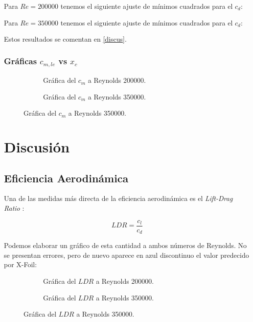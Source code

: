 \documentclass{article}
\begin{document}
Para $Re = 200000$ tenemos el siguiente ajuste de mínimos cuadrados para el $c_d$:



Para $Re = 350000$ tenemos el siguiente ajuste de mínimos cuadrados para el $c_d$:



Estos resultados se comentan en \ref{discus}.

\subsubsection{Gráficas \texorpdfstring{$c_{m,le}$}{momentos} vs \texorpdfstring{$x_c$}{posición}}

\begin{figure}[H]
    \centering
    \begin{subfigure}{.48\textwidth}
        \resizebox{\linewidth}{!}{}
        \caption{Gráfica del $c_{m}$ a Reynolds 200000. }
        \label{fig:res13}    
    \end{subfigure}
    \hspace{0cm}
    \begin{subfigure}{.48\textwidth}
        \resizebox{\linewidth}{!}{}
        \caption{Gráfica del $c_{m}$ a Reynolds 350000. }
        \label{fig:res14}     
    \end{subfigure}
\end{figure}
\section{Discusión}

\subsection{Eficiencia Aerodinámica}

Una de las medidas más directa de la eficiencia aerodinámica es el \textit{Lift-Drag Ratio} \cite{Anderson}:

$$LDR = \frac{c_l}{c_d}$$

Podemos elaborar un gráfico de esta cantidad a ambos números de Reynolds. No se presentan errores, pero de nuevo aparece en azul 
discontinuo el valor predecido por X-Foil:

\begin{figure}[H]
    \centering
    \begin{subfigure}{.48\textwidth}
        \resizebox{\linewidth}{!}{}
        \caption{Gráfica del $LDR$ a Reynolds 200000. }
        \label{fig:res13}    
    \end{subfigure}
    \hspace{0cm}
    \begin{subfigure}{.48\textwidth}
        \resizebox{\linewidth}{!}{}
        \caption{Gráfica del $LDR$ a Reynolds 350000. }
        \label{fig:res14}     
    \end{subfigure}
\end{figure}
\end{document}
